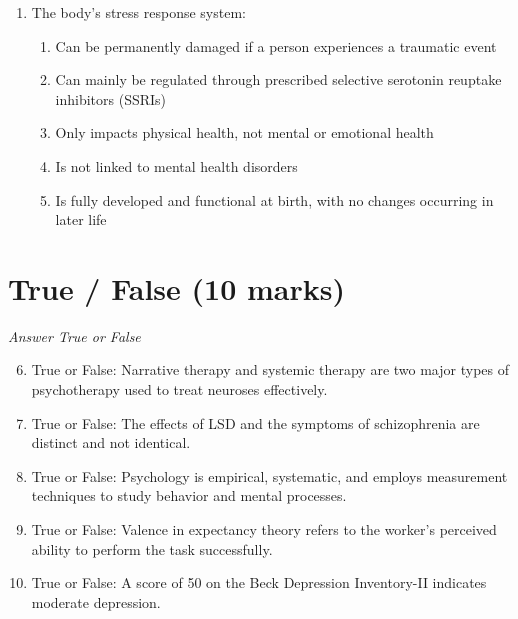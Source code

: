 \documentclass[12pt]{article}
\begin{document}
\begin{enumerate}[label=\arabic*.]
\begin{enumerate}[label=(\alph*)]
    \item Stimulant medications are typically employed to reduce anxiety
    \item Antibiotics are used in the treatment of anxiety
    \item Antifungal drugs are used to treat anxiety disorders
    \item Anti-inflammatory drugs are the primary treatment for anxiety
    \item Hormone replacement therapy is utilized for managing anxiety
\end{enumerate}
\item The body's stress response system:
\begin{enumerate}[label=(\alph*)]
    \item Can be permanently damaged if a person experiences a traumatic event
    \item Can mainly be regulated through prescribed selective serotonin reuptake inhibitors (SSRIs)
    \item Only impacts physical health, not mental or emotional health
    \item Is not linked to mental health disorders
    \item Is fully developed and functional at birth, with no changes occurring in later life
\end{enumerate}
\end{enumerate}

\section*{True / False (10 marks)}
\textit{Answer True or False}
\begin{enumerate}[label=\arabic*.]
\setcounter{enumi}{5}
\item True or False: Narrative therapy and systemic therapy are two major types of psychotherapy used to treat neuroses effectively.
\item True or False: The effects of LSD and the symptoms of schizophrenia are distinct and not identical.
\item True or False: Psychology is empirical, systematic, and employs measurement techniques to study behavior and mental processes.
\item True or False: Valence in expectancy theory refers to the worker's perceived ability to perform the task successfully.
\item True or False: A score of 50 on the Beck Depression Inventory-II indicates moderate depression.
\end{enumerate}
\end{document}
